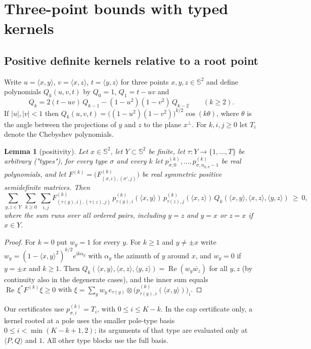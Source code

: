 \documentclass[11pt]{article}
\newtheorem{lemma}[theorem]{Lemma}
\theoremstyle{definition}
\newcommand{\Sph}{\mathbb{S}^2}
\newcommand{\ip}[2]{\langle #1,#2\rangle}
\begin{document}
\section{Three-point bounds with typed kernels}\label{sec:bounds}

\subsection{Positive definite kernels relative to a root point}
Write $u=\ip{x}{y}$, $v=\ip{x}{z}$, $t=\ip{y}{z}$ for three points $x,y,z\in\Sph$ and define polynomials
$Q_k(u,v,t)$ by $Q_0=1$, $Q_1=t-uv$ and
\[
 Q_k=2(t-uv)\,Q_{k-1}-(1-u^2)(1-v^2)\,Q_{k-2}\qquad(k\ge2).
\]
If $|u|,|v|<1$ then $Q_k(u,v,t)=\big((1-u^2)(1-v^2)\big)^{k/2}\cos(k\theta)$, where $\theta$ is the angle between the
projections of $y$ and $z$ to the plane $x^\perp$. For $k,i,j\ge0$ let $T_i$ denote the Chebyshev polynomials.

\begin{lemma}[positivity]\label{lem:pd}
Let $x\in\Sph$, let $Y\subset\Sph$ be finite, let $\tau:Y\to\{1,\dots,T\}$ be arbitrary ("types"), for every type
$\sigma$ and every $k$ let $p^{(k)}_{\sigma,0},\dots,p^{(k)}_{\sigma,n_{k,\sigma}-1}$ be real polynomials, and let
$F^{(k)}=\big(F^{(k)}_{(\sigma,i),(\sigma',j)}\big)$ be real symmetric positive semidefinite matrices. Then
\[
 \sum_{y,z\in Y}\ \sum_{k\ge 0}\ \sum_{i,j} F^{(k)}_{(\tau(y),i),(\tau(z),j)}\,p^{(k)}_{\tau(y),i}(\ip{x}{y})\,p^{(k)}_{\tau(z),j}(\ip{x}{z})\,
 Q_k(\ip{x}{y},\ip{x}{z},\ip{y}{z})\ \ge\ 0 ,
\]
where the sum runs over all ordered pairs, including $y=z$ and $y=x$ or $z=x$ if $x\in Y$.
\end{lemma}
\begin{proof}
For $k=0$ put $w_y=1$ for every $y$. For $k\ge1$ and $y\neq\pm x$ write
$w_y=(1-\ip{x}{y}^2)^{k/2}e^{\mathrm{i}k\alpha_y}$ with $\alpha_y$ the azimuth of $y$ around $x$,
and $w_y=0$ if $y=\pm x$ and $k\ge1$. Then $Q_k(\ip{x}{y},\ip{x}{z},\ip{y}{z})=\operatorname{Re}(w_y\overline{w_z})$ for all
$y,z$ (by continuity also in the degenerate cases), and the inner sum equals
$\operatorname{Re}\,\xi^{*}F^{(k)}\xi\ge 0$ with $\xi=\sum_{y}w_y\,e_{\tau(y)}\otimes\big(p^{(k)}_{\tau(y),i}(\ip{x}{y})\big)_i$.
\end{proof}
Our certificates use $p^{(k)}_{\sigma,i}=T_i$, with $0\le i\le K-k$.
In the cap certificate only, a kernel rooted at a pole uses the smaller pole-type basis
$0\le i<\min(K-k+1,2)$; its arguments of that type are evaluated only at $\ip PQ$ and $1$.
All other type blocks use the full basis.
\end{document}
